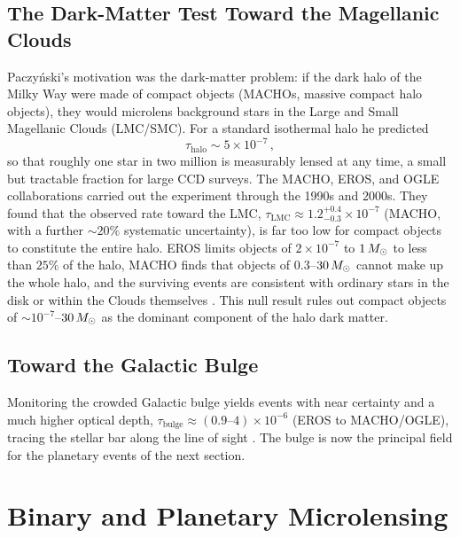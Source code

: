 \subsection{The Dark-Matter Test Toward the Magellanic Clouds}

Paczy\'nski's motivation was the dark-matter problem: if the dark halo of
the Milky Way were made of compact objects (MACHOs, massive compact halo
objects), they would microlens background stars in the Large and Small
Magellanic Clouds (LMC/SMC).  For a standard isothermal halo he predicted
\begin{equation}
    \tau_{\mathrm{halo}} \sim 5 \times 10^{-7} \,,
    \label{eq:micro_tau_halo}
\end{equation}
so that roughly one star in two million is measurably lensed at any time, a
small but tractable fraction for large CCD surveys.  The MACHO, EROS, and
OGLE collaborations carried out the experiment through the 1990s and 2000s.
They found that the observed rate toward the LMC,
$\tau_{\mathrm{LMC}} \approx 1.2^{+0.4}_{-0.3} \times 10^{-7}$ (MACHO, with a
further $\sim\!20\%$ systematic uncertainty), is far too low for compact
objects to constitute the entire halo.  EROS limits objects of
$2\times10^{-7}$ to $1\,M_{\odot}$ to less than $25\%$ of the halo, MACHO finds
that objects of $0.3$--$30\,M_{\odot}$ cannot make up the whole halo, and the
surviving events are consistent with ordinary stars in the disk or within the
Clouds themselves \citep[Sect.~3.5]{schneider_kochanek_wambsganss_2006}.
This null result rules out compact objects of
$\sim\!10^{-7}$--$30\,M_{\odot}$ as the dominant component of the halo dark
matter.

\subsection{Toward the Galactic Bulge}

Monitoring the crowded Galactic bulge yields events with near certainty and a
much higher optical depth,
$\tau_{\mathrm{bulge}} \approx (0.9\text{--}4) \times 10^{-6}$ (EROS to
MACHO/OGLE), tracing the
stellar bar along the line of sight
\citep[Sect.~3.6]{schneider_kochanek_wambsganss_2006}.  The bulge is now the
principal field for the planetary events of the next section.


\section{Binary and Planetary Microlensing}
\label{sec:binary_planet}

